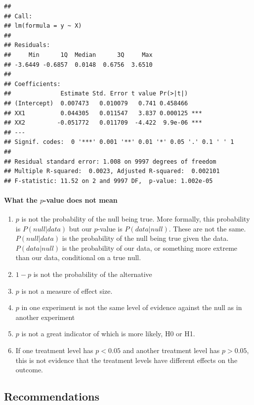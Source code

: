 \documentclass[]{book}
\providecommand{\tightlist}{%
  \setlength{\itemsep}{0pt}\setlength{\parskip}{0pt}}
\let\oldparagraph\paragraph
\renewcommand{\paragraph}[1]{\oldparagraph{#1}\mbox{}}
\theoremstyle{definition}
\theoremstyle{definition}
\theoremstyle{definition}
\theoremstyle{remark}
\begin{document}
\begin{verbatim}
## 
## Call:
## lm(formula = y ~ X)
## 
## Residuals:
##     Min      1Q  Median      3Q     Max 
## -3.6449 -0.6857  0.0148  0.6756  3.6510 
## 
## Coefficients:
##              Estimate Std. Error t value Pr(>|t|)    
## (Intercept)  0.007473   0.010079   0.741 0.458466    
## XX1          0.044305   0.011547   3.837 0.000125 ***
## XX2         -0.051772   0.011709  -4.422  9.9e-06 ***
## ---
## Signif. codes:  0 '***' 0.001 '**' 0.01 '*' 0.05 '.' 0.1 ' ' 1
## 
## Residual standard error: 1.008 on 9997 degrees of freedom
## Multiple R-squared:  0.0023, Adjusted R-squared:  0.002101 
## F-statistic: 11.52 on 2 and 9997 DF,  p-value: 1.002e-05
\end{verbatim}

\paragraph{\texorpdfstring{What the \(p\)-value does not
mean}{What the p-value does not mean}}\label{what-the-p-value-does-not-mean}

\begin{enumerate}
\def\labelenumi{\arabic{enumi}.}
\tightlist
\item
  \(p\) is not the probability of the null being true. More formally,
  this probability is \(P(null | data)\) but our \(p\)-value is
  \(P(data | null)\). These are not the same. \(P(null | data)\) is the
  probability of the null being true given the data. \(P(data | null)\)
  is the probability of our data, or something more extreme than our
  data, conditional on a true null.
\item
  \(1-p\) is not the probability of the alternative
\item
  \(p\) is not a measure of effect size.
\item
  \(p\) in one experiment is not the same level of evidence against the
  null as in another experiment
\item
  \(p\) is not a great indicator of which is more likely, H0 or H1.
\item
  If one treatment level has \(p < 0.05\) and another treatment level
  has \(p > 0.05\), this is not evidence that the treatment levels have
  different effects on the outcome.
\end{enumerate}

\subsection{Recommendations}\label{recommendations}
\end{document}
